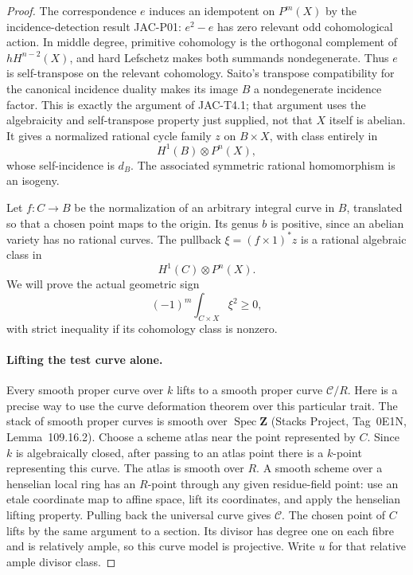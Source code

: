 \documentclass[11pt]{article}
\theoremstyle{remark}\newtheorem{remark}[theorem]{Remark}
\begin{document}
\begin{proof}
The correspondence $e$ induces an idempotent on $P^m(X)$ by the
incidence-detection result JAC-P01: $e^2-e$ has zero relevant odd
cohomological action. In middle degree, primitive cohomology is the
orthogonal complement of $hH^{n-2}(X)$, and hard Lefschetz makes both
summands nondegenerate. Thus $e$ is self-transpose on the relevant
cohomology. Saito's transpose compatibility for the canonical
incidence duality makes its image $B$ a nondegenerate incidence
factor. This is exactly the argument of JAC-T4.1; that argument uses
the algebraicity and self-transpose property just supplied, not that
$X$ itself is abelian. It gives a normalized rational cycle family
$z$ on $B\times X$, with class entirely in
\[
                H^1(B)\otimes P^n(X),
\]
whose self-incidence is $d_B$. The associated symmetric rational
homomorphism is an isogeny.

Let $f:C\to B$ be the normalization of an arbitrary integral curve
in $B$, translated so that a chosen point maps to the origin. Its
genus $b$ is positive, since an abelian variety has no rational
curves. The pullback $\xi=(f\times1)^*z$ is a rational algebraic
class in
\[
                  H^1(C)\otimes P^n(X).
 \tag{C44.W10.4}
\]
We will prove the actual geometric sign
\[
                         (-1)^m\int_{C\times X}\xi^2\geq0,
 \tag{C44.W10.5}
\]
with strict inequality if its cohomology class is nonzero.

\paragraph{Lifting the test curve alone.}
Every smooth proper curve over $k$ lifts to a smooth proper curve
$\mathscr C/R$. Here is a precise way to use the curve deformation
theorem over this particular trait. The stack of smooth proper
curves is smooth over $\operatorname{Spec}\mathbf Z$ (Stacks
Project, Tag~0E1N, Lemma~109.16.2). Choose a scheme atlas near the
point represented by $C$. Since $k$ is algebraically closed, after
passing to an atlas point there is a $k$-point representing this
curve. The atlas is smooth over $R$. A smooth scheme over a
henselian local ring has an $R$-point through any given residue-field
point: use an etale coordinate map to affine space, lift its
coordinates, and apply the henselian lifting property. Pulling back
the universal curve gives $\mathscr C$. The chosen point of $C$
lifts by the same argument to a section. Its divisor has degree one
on each fibre and is relatively ample, so this curve model is
projective. Write $u$ for that relative ample divisor class.


\end{proof}
\end{document}
